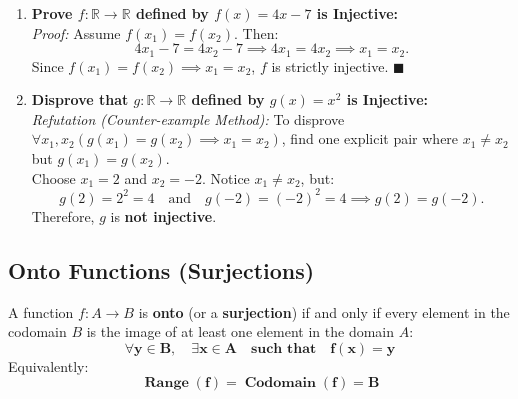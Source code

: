 \documentclass[11pt,a4paper]{article}
\begin{document}
\begin{examplebox}
\begin{enumerate}
    \item \textbf{Prove $f: \mathbb{R} \to \mathbb{R}$ defined by $f(x) = 4x - 7$ is Injective:}\\
    \textit{Proof:} Assume $f(x_1) = f(x_2)$. Then:
    \[
    4x_1 - 7 = 4x_2 - 7 \implies 4x_1 = 4x_2 \implies x_1 = x_2.
    \]
    Since $f(x_1) = f(x_2) \implies x_1 = x_2$, $f$ is strictly injective. $\blacksquare$

    \item \textbf{Disprove that $g: \mathbb{R} \to \mathbb{R}$ defined by $g(x) = x^2$ is Injective:}\\
    \textit{Refutation (Counter-example Method):} To disprove $\forall x_1, x_2 (g(x_1)=g(x_2) \implies x_1=x_2)$, find one explicit pair where $x_1 \neq x_2$ but $g(x_1) = g(x_2)$.\\
    Choose $x_1 = 2$ and $x_2 = -2$. Notice $x_1 \neq x_2$, but:
    \[
    g(2) = 2^2 = 4 \quad \text{and} \quad g(-2) = (-2)^2 = 4 \implies g(2) = g(-2).
    \]
    Therefore, $g$ is \textbf{not injective}.
\end{enumerate}
\end{examplebox}

\subsection{Onto Functions (Surjections)}

\begin{defbox}
A function $f: A \to B$ is \textbf{onto} (or a \textbf{surjection}) if and only if every element in the codomain $B$ is the image of at least one element in the domain $A$:
\[
\mathbf{\forall y \in B, \quad \exists x \in A \quad \text{such that} \quad f(x) = y}
\]
Equivalently:
\[
\mathbf{\operatorname{Range}(f) = \operatorname{Codomain}(f) = B}
\]
\end{defbox}
\end{document}
